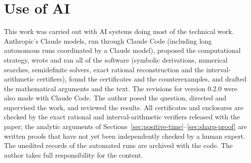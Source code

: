\documentclass[11pt]{article}
\theoremstyle{definition}
\theoremstyle{remark}
\begin{document}
\section*{Use of AI}
This work was carried out with AI systems doing most of the technical work.
Anthropic's Claude models, run through Claude Code (including long autonomous runs
coordinated by a Claude model), proposed the computational strategy, wrote and ran all
of the software (symbolic derivations, numerical searches, semidefinite solvers, exact
rational reconstruction and the interval-arithmetic certifiers), found the certificates
and the counterexamples, and drafted the mathematical arguments and the text. The
revisions for version 0.2.0 were also made with Claude Code. The author posed the
question, directed and supervised the work, and reviewed the results. All certificates
and enclosures are checked by the exact rational and interval-arithmetic verifiers
released with the paper; the analytic arguments of Sections~\ref{sec:positive-time}--\ref{sec:sharp-proof}
are written proofs that have not yet been independently checked by a human expert.
The unedited records of the automated runs are archived with the code. The author
takes full responsibility for the content.

\appendix
\end{document}
